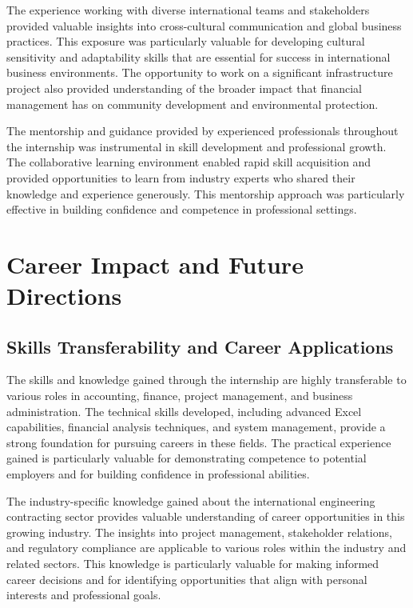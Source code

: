 The experience working with diverse international teams and stakeholders provided valuable insights into cross-cultural communication and global business practices. This exposure was particularly valuable for developing cultural sensitivity and adaptability skills that are essential for success in international business environments. The opportunity to work on a significant infrastructure project also provided understanding of the broader impact that financial management has on community development and environmental protection.

The mentorship and guidance provided by experienced professionals throughout the internship was instrumental in skill development and professional growth. The collaborative learning environment enabled rapid skill acquisition and provided opportunities to learn from industry experts who shared their knowledge and experience generously. This mentorship approach was particularly effective in building confidence and competence in professional settings.

\section{Career Impact and Future Directions}

\subsection{Skills Transferability and Career Applications}
The skills and knowledge gained through the internship are highly transferable to various roles in accounting, finance, project management, and business administration. The technical skills developed, including advanced Excel capabilities, financial analysis techniques, and system management, provide a strong foundation for pursuing careers in these fields. The practical experience gained is particularly valuable for demonstrating competence to potential employers and for building confidence in professional abilities.

The industry-specific knowledge gained about the international engineering contracting sector provides valuable understanding of career opportunities in this growing industry. The insights into project management, stakeholder relations, and regulatory compliance are applicable to various roles within the industry and related sectors. This knowledge is particularly valuable for making informed career decisions and for identifying opportunities that align with personal interests and professional goals.

